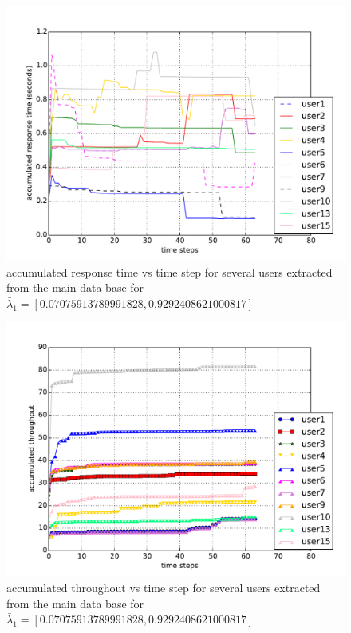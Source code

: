 \documentclass[10pt,journal,compsoc]{IEEEtran}
\begin{document}
 


\begin{figure}[h] %
\includegraphics[width=\linewidth]{graphs/rt_step_lambda1}
\caption{ accumulated response time vs time step for several users extracted from the main data base for  $\bar{\lambda}_1 =[0.07075913789991828, 0.9292408621000817]$}
\end{figure}

\begin{figure}[h]
\includegraphics[width=\linewidth]{graphs/trough_step_lambda1}
\caption{accumulated throughout vs time step for several users extracted from the main data base for $\bar{\lambda}_1 =[0.07075913789991828, 0.9292408621000817]$}
\end{figure}
\end{document}
